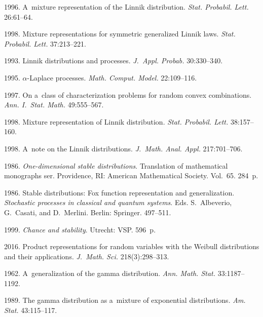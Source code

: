 \begin{multicols}{2}
{{\begin{thebibliography}{99}
 1996. 
A~mixture representation of the Linnik distribution. 
\textit{Stat. Probabil. Lett.} 26:61--64.

 1998. Mixture representations for symmetric generalized
Linnik laws. \textit{Stat. Probabil. Lett.} 37:213--221.



 1993. Linnik distributions and
processes. \textit{J.~Appl. Probab.} 30:330--340.

 1995. $\alpha$-Laplace processes. \textit{Math. 
 Comput. Model.} 22:109--116.

 1997. 
On a~class of characterization problems for random convex combinations. 
\textit{Ann. I.~Stat. Math.} 49:555--567.



 1998. Mixture representation of Linnik distribution. 
\textit{Stat. Probabil. Lett.} 38:157--160.

 1998. A~note on the Linnik distributions. 
\textit{J.~Math. Anal. Appl.} 217:701--706.

 1986. \textit{One-dimensional stable distributions}.
 Translation of mathematical monographs ser.
 Providence, RI:
 American Mathematical Society. Vol.~65. 284~p. 


 1986. Stable distributions: Fox function
representation and generalization. 
\textit{Stochastic processes in classical and quantum
systems}. Eds. S.~Albeverio, G.~Casati, and D.~Merlini. 
Berlin: Springer. 497--511.

 1999. 
\textit{Chance and stability}. Utrecht: VSP. 596~p.

 2016. Product representations for random variables with 
the Weibull distributions and their applications. 
\textit{J.~Math. Sci.} 218(3):298--313.

 1962. A~generalization of the gamma distribution.
\textit{Ann. Math. Stat.} 33:1187--1192.

 1989. The gamma distribution as a~mixture of
exponential distributions. \textit{Am. Stat.} 43:115--117.


\end{thebibliography}}}
\end{multicols}
